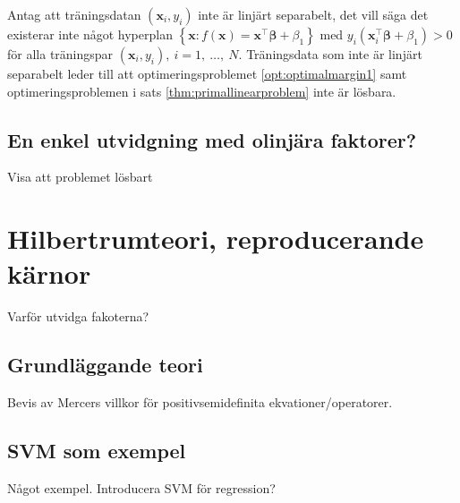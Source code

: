 \documentclass[a4paper, 12pt]{report}
\theoremstyle{definition}
\theoremstyle{remark}
\newcommand{\bfbeta}{{\boldsymbol{\beta}}}
\begin{document}
Antag att träningsdatan $\left(\mathbf{x}_i, y_i\right)$ inte är linjärt separabelt, det vill säga det existerar inte något hyperplan $\left\{\mathbf{x} : f\left(\mathbf{x}\right) = \mathbf{x}^\intercal \bfbeta + \beta_1 \right\}$ med $y_i\left(\mathbf{x}_i^\intercal\bfbeta+\beta_1\right)>0$ för alla träningspar $(\mathbf{x}_i,y_i),~i=1,~\dots,~N$. Träningsdata som inte är linjärt separabelt leder till att optimeringsproblemet \ref{opt:optimalmargin1} samt optimeringsproblemen i sats \ref{thm:primallinearproblem} inte är lösbara.

\section{En enkel utvidgning med olinjära faktorer?}
Visa att problemet lösbart
\chapter{Hilbertrumteori, reproducerande kärnor}\label{chap:hilbert}
Varför utvidga fakoterna?
\section{Grundläggande teori}
Bevis av Mercers villkor för positivsemidefinita ekvationer/operatorer.
\section{SVM som exempel}
Något exempel. Introducera SVM för regression?



\end{document}
